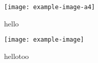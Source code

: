 

\begin{figure}[!htb]
  \centering
  \begin{minipage}[b]{0.35\textwidth}
    \centering
    \texttt{[image: example-image-a4]}
    \caption{hello}
    \label{}
  \end{minipage}
  \hfill
  \begin{minipage}[b]{0.35\textwidth}
    \centering
    \texttt{[image: example-image]}
    \caption{hellotoo}
  \end{minipage}
\end{figure}

\clearpage %